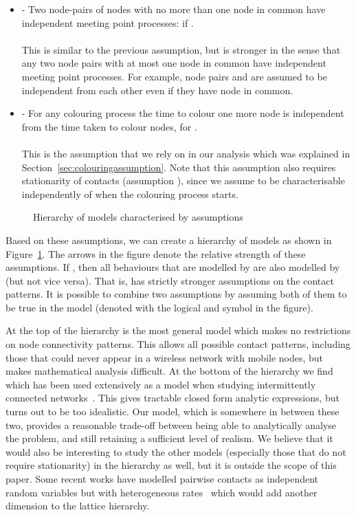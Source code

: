 \documentclass{article}
\begin{document}
\begin{itemize}
\item  - Two node-pairs of nodes with no more than one
  node in common have independent meeting point processes:  if . \\
  \\
  This is similar to the previous assumption, but is stronger in the
  sense that any two node pairs with at most one node in common have
  independent meeting point processes. For example, node pairs 
  and  are assumed to be independent from each other even if
  they have node  in common.
\item  - For any colouring process the time to colour one more
  node is independent from the time taken to colour  nodes,  for .\\
  \\
  This is the assumption that we rely on in our analysis which was
  explained in Section~\ref{sec:colouringassumption}. Note that this
  assumption also requires stationarity of contacts (assumption
  ), since we assume  to be characterisable
  independently of when the colouring process starts.
\end{itemize}
\begin{figure}[tb]
  \centering
   \caption{Hierarchy of models characterised by assumptions}
  \label{fig:hierarchy}
\end{figure}


Based on these assumptions, we can create a hierarchy of models as
shown in Figure~\ref{fig:hierarchy}. The arrows in the figure denote
the relative strength of these assumptions. If , then
all behaviours that are modelled by  are also modelled by  (but
not vice versa). That is,  has strictly stronger assumptions on the
contact patterns. It is possible to combine two assumptions by
assuming both of them to be true in the model (denoted with the
logical and symbol  in the figure).

At the top of the hierarchy is the most general model 
which makes no restrictions on node connectivity patterns. This allows
all possible contact patterns, including those that could never appear
in a wireless network with mobile nodes, but makes mathematical
analysis difficult. At the bottom of the hierarchy we find
 which has been used extensively as a
model when studying intermittently connected
networks~\cite{altman10,resta11}. This gives tractable closed form
analytic expressions, but turns out to be too idealistic. Our model,
which is somewhere in between these two, provides a reasonable
trade-off between being able to analytically analyse the problem, and
still retaining a sufficient level of realism. We believe that it would
also be interesting to study the other models (especially those that
do not require stationarity) in the hierarchy as well, but it is
outside the scope of this paper. Some recent works have modelled
pairwise contacts as independent random variables but with
heterogeneous rates~\cite{picu12} which would add another dimension to
the lattice hierarchy.
\end{document}
